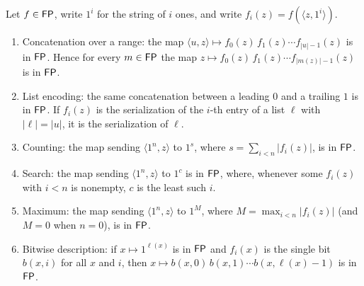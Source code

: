 \begin{lemma}
  \label{lem:polytime-fp-combinators}
  \leanok
  Let $f \in \mathsf{FP}$, write $1^i$ for the string of $i$ ones, and write
  $f_i(z) = f(\langle z, 1^i \rangle)$.
  \begin{enumerate}
    \item Concatenation over a range: the map
      $\langle u, z \rangle \mapsto f_0(z) \, f_1(z) \cdots f_{|u| - 1}(z)$
      is in $\mathsf{FP}$. Hence for every $m \in \mathsf{FP}$ the map
      $z \mapsto f_0(z) \, f_1(z) \cdots f_{|m(z)| - 1}(z)$ is in $\mathsf{FP}$.
    \item List encoding: the same concatenation between a leading $0$ and a
      trailing $1$ is in $\mathsf{FP}$. If $f_i(z)$ is the serialization of the
      $i$-th entry of a list $\ell$ with $|\ell| = |u|$, it is the
      serialization of $\ell$.
    \item Counting: the map sending $\langle 1^n, z \rangle$ to $1^s$, where
      $s = \sum_{i < n} |f_i(z)|$, is in $\mathsf{FP}$.
    \item Search: the map sending $\langle 1^n, z \rangle$ to $1^c$ is in
      $\mathsf{FP}$, where, whenever some $f_i(z)$ with $i < n$ is nonempty, $c$
      is the least such $i$.
    \item Maximum: the map sending $\langle 1^n, z \rangle$ to $1^M$, where
      $M = \max_{i < n} |f_i(z)|$ (and $M = 0$ when $n = 0$), is in
      $\mathsf{FP}$.
    \item Bitwise description: if $x \mapsto 1^{\ell(x)}$ is in $\mathsf{FP}$ and
      $f_i(x)$ is the single bit $b(x, i)$ for all $x$ and $i$, then
      $x \mapsto b(x, 0) \, b(x, 1) \cdots b(x, \ell(x) - 1)$ is in $\mathsf{FP}$.
  \end{enumerate}
\end{lemma}
